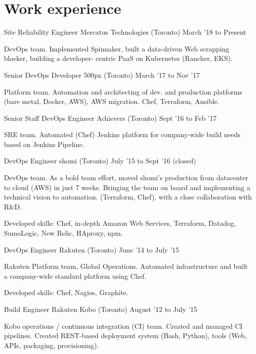 \documentclass[]{cvpn}
\begin{document}
\section{Work experience}
\begin{eventlist}

\item{Site Reliability Engineer}
     {Mercatus Technologies (Toronto)}
     {March '18 to Present}
     
DevOps team.
Implemented Spinnaker,
built a data-driven Web scrapping blocker,
building a developer- centric PaaS on Kubernetes
(Rancher, EKS).

\item{Senior DevOps Developer}
     {500px (Toronto)}
     {March '17 to Nov '17}

Platform team.
Automation and architecting of dev.
and production platforms (bare metal, Docker, AWS),
AWS migration. Chef, Terraform, Ansible.

\item{Senior Staff DevOps Engineer}
     {Achievers (Toronto)}
     {Sept '16 to Feb '17}

SRE team.
Automated (Chef) Jenkins platform for company-wide build
needs based on Jenkins Pipeline.

\item{DevOps Engineer}
     {shomi (Toronto)}
     {July '15 to Sept '16 (closed)}

DevOps team. As a bold team effort, moved shomi's
production from datacenter to cloud (AWS) in just 7 weeks.
Bringing the team on board and implementing a technical
vision to automation. (Terraform, Chef),
with a close collaboration with R\&D.

Developed skills: Chef, in-depth Amazon Web Services,
Terraform, Datadog, SumoLogic, New Relic, HAproxy, npm.

\item{DevOps Engineer}
     {Rakuten (Toronto)}
     {June '14 to July '15}

Rakuten Platform team, Global Operations.
Automated infrastructure and built a company-wide
standard platform using Chef.

Developed skills: Chef, Nagios, Graphite.

\item{Build Engineer}
     {Rakuten Kobo (Toronto)}
     {August '12 to July '15}

Kobo operations / continuous integration (CI) team.
Created and managed CI pipelines.
Created REST-based deployment system (Bash, Python),
tools (Web, APIs, packaging, provisioning).


\end{eventlist}
\end{document}
